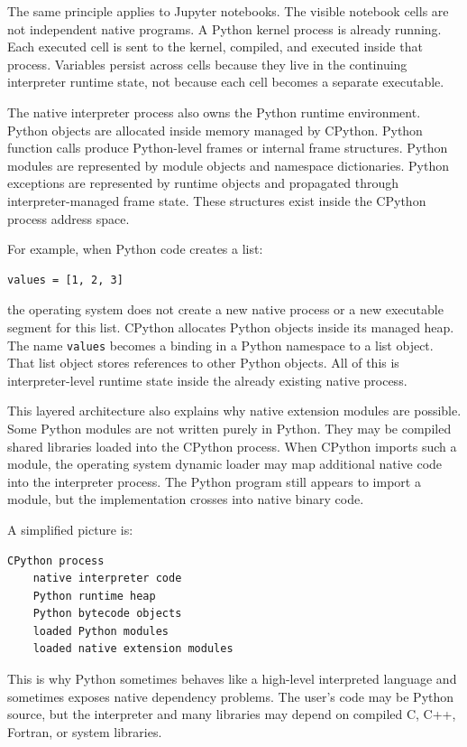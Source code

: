 \documentclass[a4paper,twoside]{report}
\begin{document}
The same principle applies to Jupyter notebooks. The visible notebook cells are not independent native programs. A Python kernel process is already running. Each executed cell is sent to the kernel, compiled, and executed inside that process. Variables persist across cells because they live in the continuing interpreter runtime state, not because each cell becomes a separate executable.

The native interpreter process also owns the Python runtime environment. Python objects are allocated inside memory managed by CPython. Python function calls produce Python-level frames or internal frame structures. Python modules are represented by module objects and namespace dictionaries. Python exceptions are represented by runtime objects and propagated through interpreter-managed frame state. These structures exist inside the CPython process address space.

For example, when Python code creates a list:

\begin{verbatim}
values = [1, 2, 3]
\end{verbatim}

the operating system does not create a new native process or a new executable segment for this list. CPython allocates Python objects inside its managed heap. The name \texttt{values} becomes a binding in a Python namespace to a list object. That list object stores references to other Python objects. All of this is interpreter-level runtime state inside the already existing native process.

This layered architecture also explains why native extension modules are possible. Some Python modules are not written purely in Python. They may be compiled shared libraries loaded into the CPython process. When CPython imports such a module, the operating system dynamic loader may map additional native code into the interpreter process. The Python program still appears to import a module, but the implementation crosses into native binary code.

A simplified picture is:

\begin{verbatim}
CPython process
    native interpreter code
    Python runtime heap
    Python bytecode objects
    loaded Python modules
    loaded native extension modules
\end{verbatim}

This is why Python sometimes behaves like a high-level interpreted language and sometimes exposes native dependency problems. The user's code may be Python source, but the interpreter and many libraries may depend on compiled C, C++, Fortran, or system libraries.
\end{document}
